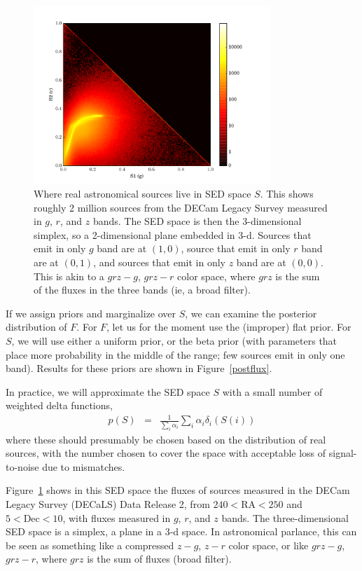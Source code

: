 \documentclass[letterpaper,preprint]{aastex}
\newcommand{\fig}{Figure}
\newcommand{\figref}[1]{\mbox{\fig~\ref{#1}}}
\begin{document}
\begin{figure}[p!]
\begin{center}
\includegraphics[width=0.8\textwidth]{bayes-05}
\end{center}
\caption{Where real astronomical sources live in SED space $S$.  This
  shows roughly 2 million sources from the DECam Legacy Survey
  measured in $g$, $r$, and $z$ bands.  The SED space is then the
  3-dimensional simplex, so a 2-dimensional plane embedded in 3-d.
  Sources that emit in only $g$ band are at $(1,0)$, source that emit
  in only $r$ band are at $(0,1)$, and sources that emit in only $z$
  band are at $(0,0)$.
  This is akin to a $grz - g$, $grz - r$ color space, where $grz$ is
  the sum of the fluxes in the three bands (ie, a broad filter).
  \label{Sgrz}}
\end{figure}



If we assign priors and marginalize over $S$, we can examine the
posterior distribution of $F$.  For $F$, let us for the moment use the
(improper) flat prior.  For $S$, we will use either a uniform prior,
or the beta prior (with parameters that place more probability in the
middle of the range; few sources emit in only one band).  Results for
these priors are shown in \figref{postflux}.


In practice, we will approximate the SED space $S$ with a small number
of weighted delta functions,
\begin{eqnarray}
p(S) &=& \frac{1}{\sum_i \alpha_i} \sum_i \alpha_i \delta_i(S(i))
\end{eqnarray}
where these should presumably be chosen based on the distribution of
real sources, with the number chosen to cover the space with
acceptable loss of signal-to-noise due to mismatches.

\figref{Sgrz} shows in this SED space the fluxes of sources measured
in the DECam Legacy Survey (DECaLS) Data Release 2, from $240 <
\textrm{RA} < 250$ and $5 < \textrm{Dec} < 10$, with fluxes measured
in $g$, $r$, and $z$ bands.  The three-dimensional SED space is a
simplex, a plane in a 3-d space.  In astronomical parlance, this can
be seen as something like a compressed $z - g$, $z - r$ color space,
or like $grz - g$, $grz - r$, where $grz$ is the sum of fluxes (broad
filter).
\end{document}
